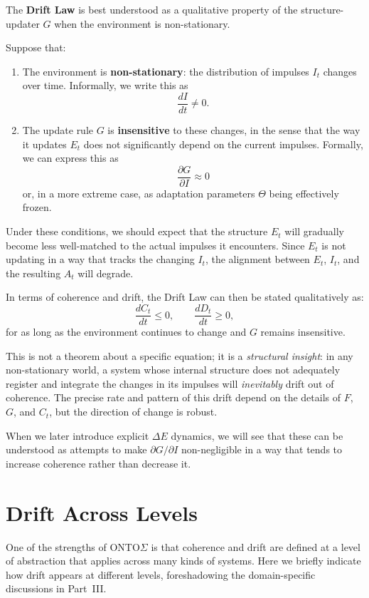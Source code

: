 \documentclass[12pt,a4paper]{report}
\begin{document}
The \textbf{Drift Law} is best understood as a qualitative property of the structure-updater \(G\) when the environment is non-stationary.

Suppose that:

\begin{enumerate}[leftmargin=2em]
    \item The environment is \textbf{non-stationary}: the distribution of impulses \(I_t\) changes over time. Informally, we write this as
    \[
        \frac{dI}{dt} \neq 0.
    \]
    \item The update rule \(G\) is \textbf{insensitive} to these changes, in the sense that the way it updates \(E_t\) does not significantly depend on the current impulses. Formally, we can express this as
    \[
        \frac{\partial G}{\partial I} \approx 0
    \]
    or, in a more extreme case, as adaptation parameters \(\Theta\) being effectively frozen.
\end{enumerate}

Under these conditions, we should expect that the structure \(E_t\) will gradually become less well-matched to the actual impulses it encounters. Since \(E_t\) is not updating in a way that tracks the changing \(I_t\), the alignment between \(E_t\), \(I_t\), and the resulting \(A_t\) will degrade.

In terms of coherence and drift, the Drift Law can then be stated qualitatively as:
\[
    \frac{dC_t}{dt} \leq 0, \qquad
    \frac{dD_t}{dt} \geq 0,
\]
for as long as the environment continues to change and \(G\) remains insensitive.

This is not a theorem about a specific equation; it is a \emph{structural insight}: in any non-stationary world, a system whose internal structure does not adequately register and integrate the changes in its impulses will \emph{inevitably} drift out of coherence. The precise rate and pattern of this drift depend on the details of \(F\), \(G\), and \(C_t\), but the direction of change is robust.

When we later introduce explicit $\Delta E$ dynamics, we will see that these can be understood as attempts to make \(\partial G / \partial I\) non-negligible in a way that tends to increase coherence rather than decrease it.

\section{Drift Across Levels}

One of the strengths of ONTO$\Sigma$ is that coherence and drift are defined at a level of abstraction that applies across many kinds of systems. Here we briefly indicate how drift appears at different levels, foreshadowing the domain-specific discussions in Part~III.
\end{document}
